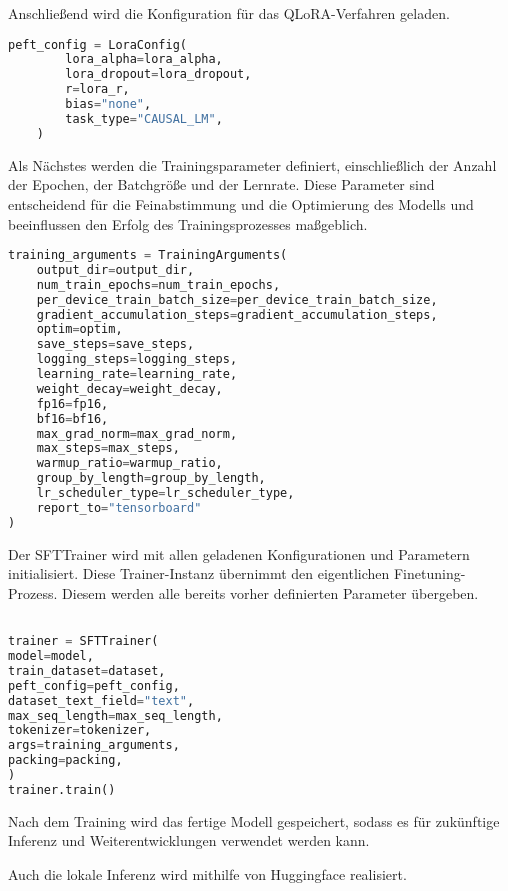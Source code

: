\documentclass[german,report]{i1thesis}
\begin{document}
Anschließend wird die Konfiguration für das \ac{QLoRA}-Verfahren geladen.\\

\begin{lstlisting}[language=Python]
    peft_config = LoraConfig(
        lora_alpha=lora_alpha,
        lora_dropout=lora_dropout,
        r=lora_r,
        bias="none",
        task_type="CAUSAL_LM",
    )
\end{lstlisting}

Als Nächstes werden die Trainingsparameter definiert, einschließlich der Anzahl der Epochen, der Batchgröße und der Lernrate.
Diese Parameter sind entscheidend für die Feinabstimmung und die Optimierung des Modells und beeinflussen den Erfolg des Trainingsprozesses maßgeblich.\\

\begin{lstlisting}[language=Python]
training_arguments = TrainingArguments(
    output_dir=output_dir,
    num_train_epochs=num_train_epochs,
    per_device_train_batch_size=per_device_train_batch_size,
    gradient_accumulation_steps=gradient_accumulation_steps,
    optim=optim,
    save_steps=save_steps,
    logging_steps=logging_steps,
    learning_rate=learning_rate,
    weight_decay=weight_decay,
    fp16=fp16,
    bf16=bf16,
    max_grad_norm=max_grad_norm,
    max_steps=max_steps,
    warmup_ratio=warmup_ratio,
    group_by_length=group_by_length,
    lr_scheduler_type=lr_scheduler_type,
    report_to="tensorboard"
)
\end{lstlisting}

Der \ac{SFT}Trainer wird mit allen geladenen Konfigurationen und Parametern initialisiert. Diese Trainer-Instanz übernimmt den eigentlichen Finetuning-Prozess.
Diesem werden alle bereits vorher definierten Parameter übergeben.\\

\begin{lstlisting}[language=Python]

trainer = SFTTrainer(
model=model,
train_dataset=dataset,
peft_config=peft_config,
dataset_text_field="text",
max_seq_length=max_seq_length,
tokenizer=tokenizer,
args=training_arguments,
packing=packing,
)
trainer.train()

\end{lstlisting}

Nach dem Training wird das fertige Modell gespeichert, sodass es für zukünftige Inferenz und Weiterentwicklungen verwendet werden kann.

Auch die lokale Inferenz wird mithilfe von Huggingface realisiert.
\end{document}
